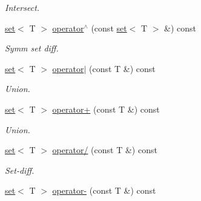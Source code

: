 \begin{DoxyCompactItemize}
\begin{DoxyCompactList}\small\item\em Intersect. \end{DoxyCompactList}\item 
\hypertarget{classmerlin_1_1set_a054f035d0051b753bc55b72067200dc5}{}\hyperlink{classmerlin_1_1set}{set}$<$ T $>$ \hyperlink{classmerlin_1_1set_a054f035d0051b753bc55b72067200dc5}{operator$^\wedge$} (const \hyperlink{classmerlin_1_1set}{set}$<$ T $>$ \&) const \label{classmerlin_1_1set_a054f035d0051b753bc55b72067200dc5}

\begin{DoxyCompactList}\small\item\em Symm set diff. \end{DoxyCompactList}\item 
\hypertarget{classmerlin_1_1set_a3c2bd97561ea5e7cd651cb4d6bcbf677}{}\hyperlink{classmerlin_1_1set}{set}$<$ T $>$ \hyperlink{classmerlin_1_1set_a3c2bd97561ea5e7cd651cb4d6bcbf677}{operator$\vert$} (const T \&) const \label{classmerlin_1_1set_a3c2bd97561ea5e7cd651cb4d6bcbf677}

\begin{DoxyCompactList}\small\item\em Union. \end{DoxyCompactList}\item 
\hypertarget{classmerlin_1_1set_a3da3e8798b664f7e746a6729e96a3536}{}\hyperlink{classmerlin_1_1set}{set}$<$ T $>$ \hyperlink{classmerlin_1_1set_a3da3e8798b664f7e746a6729e96a3536}{operator+} (const T \&) const \label{classmerlin_1_1set_a3da3e8798b664f7e746a6729e96a3536}

\begin{DoxyCompactList}\small\item\em Union. \end{DoxyCompactList}\item 
\hypertarget{classmerlin_1_1set_a24b9eb766ec4c25ded1309bcd1c39526}{}\hyperlink{classmerlin_1_1set}{set}$<$ T $>$ \hyperlink{classmerlin_1_1set_a24b9eb766ec4c25ded1309bcd1c39526}{operator/} (const T \&) const \label{classmerlin_1_1set_a24b9eb766ec4c25ded1309bcd1c39526}

\begin{DoxyCompactList}\small\item\em Set-\/diff. \end{DoxyCompactList}\item 
\hypertarget{classmerlin_1_1set_af97e3a5d5f7c4e8b3e9a19faef1f4ee2}{}\hyperlink{classmerlin_1_1set}{set}$<$ T $>$ \hyperlink{classmerlin_1_1set_af97e3a5d5f7c4e8b3e9a19faef1f4ee2}{operator-\/} (const T \&) const \label{classmerlin_1_1set_af97e3a5d5f7c4e8b3e9a19faef1f4ee2}


\end{DoxyCompactItemize}
